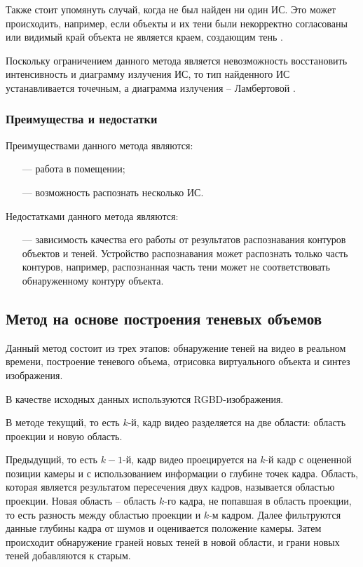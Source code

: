 Также стоит упомянуть случай, когда не был найден ни один ИС. Это может происходить, например, если объекты и их тени были некорректно согласованы или видимый край объекта не является краем, создающим тень \cite{shadow_contours_method}.

Поскольку ограничением данного метода является невозможность восстановить интенсивность и диаграмму излучения ИС, то тип найденного ИС устанавливается точечным, а диаграмма излучения -- Ламбертовой \cite{shadow_contours_method}.

\subsubsection*{Преимущества и недостатки}

Преимуществами данного метода являются:

\begin{itemize}
	\item[---] работа в помещении;
	\item[---] возможность распознать несколько ИС. 
\end{itemize}

Недостатками данного метода являются:

\begin{itemize}
	\item[---] зависимость качества его работы от результатов распознавания контуров объектов и теней. Устройство распознавания может распознать только часть контуров, например, распознанная часть тени может не соответствовать обнаруженному контуру объекта.
\end{itemize}

\subsection{Метод на основе построения теневых объемов}

Данный метод состоит из трех этапов: обнаружение теней на видео в реальном времени, построение теневого объема, отрисовка виртуального объекта и синтез изображения.

В качестве исходных данных используются RGBD-изображения.

В методе текущий, то есть $k$-й, кадр видео разделяется на две области: область проекции и новую область. 

Предыдущий, то есть $k-1$-й, кадр видео проецируется на $k$-й кадр с оцененной позиции камеры и с использованием информации о глубине точек кадра. Область, которая является результатом пересечения двух кадров, называется областью проекции. Новая область -- область $k$-го кадра, не попавшая в область проекции, то есть разность между областью проекции и $k$-м кадром. Далее фильтруются данные глубины кадра от шумов и оценивается положение камеры. Затем происходит обнаружение граней новых теней в новой области, и грани новых теней добавляются к старым. 

